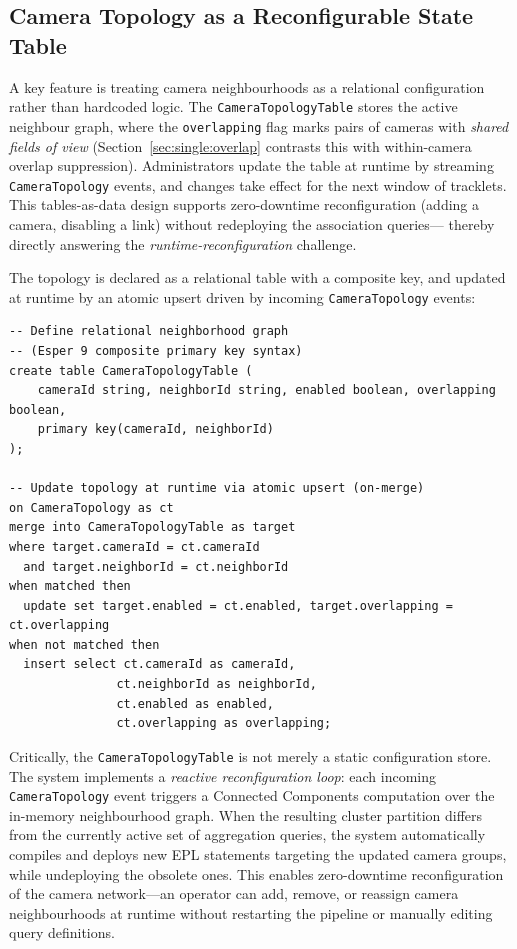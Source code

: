 \documentclass[review]{elsarticle}
\begin{document}
\subsection{Camera Topology as a Reconfigurable State Table}
\label{sec:multi:topology}
A key feature is treating camera neighbourhoods as a relational configuration rather than hardcoded logic. The \texttt{CameraTopologyTable} stores the active neighbour graph, where the \texttt{overlapping} flag marks pairs of cameras with \emph{shared fields of view} (Section~\ref{sec:single:overlap} contrasts this with within-camera overlap suppression). Administrators update the table at runtime by streaming \texttt{CameraTopology} events, and changes take effect for the next window of tracklets. This tables-as-data design supports zero-downtime reconfiguration (adding a camera, disabling a link) without redeploying the association queries--- thereby directly answering the \emph{runtime-reconfiguration} challenge.

The topology is declared as a relational table with a composite key, and updated at runtime by an atomic upsert driven by incoming \texttt{CameraTopology} events:
\begin{verbatim}
-- Define relational neighborhood graph
-- (Esper 9 composite primary key syntax)
create table CameraTopologyTable (
    cameraId string, neighborId string, enabled boolean, overlapping boolean,
    primary key(cameraId, neighborId)
);

-- Update topology at runtime via atomic upsert (on-merge)
on CameraTopology as ct
merge into CameraTopologyTable as target
where target.cameraId = ct.cameraId
  and target.neighborId = ct.neighborId
when matched then
  update set target.enabled = ct.enabled, target.overlapping = ct.overlapping
when not matched then
  insert select ct.cameraId as cameraId,
               ct.neighborId as neighborId,
               ct.enabled as enabled,
               ct.overlapping as overlapping;
\end{verbatim}

Critically, the \texttt{CameraTopologyTable} is not merely a static configuration store. The system implements a \emph{reactive reconfiguration loop}: each incoming \texttt{CameraTopology} event triggers a Connected Components computation over the in-memory neighbourhood graph. When the resulting cluster partition differs from the currently active set of aggregation queries, the system automatically compiles and deploys new EPL statements targeting the updated camera groups, while undeploying the obsolete ones. This enables zero-downtime reconfiguration of the camera network---an operator can add, remove, or reassign camera neighbourhoods at runtime without restarting the pipeline or manually editing query definitions.
\end{document}
